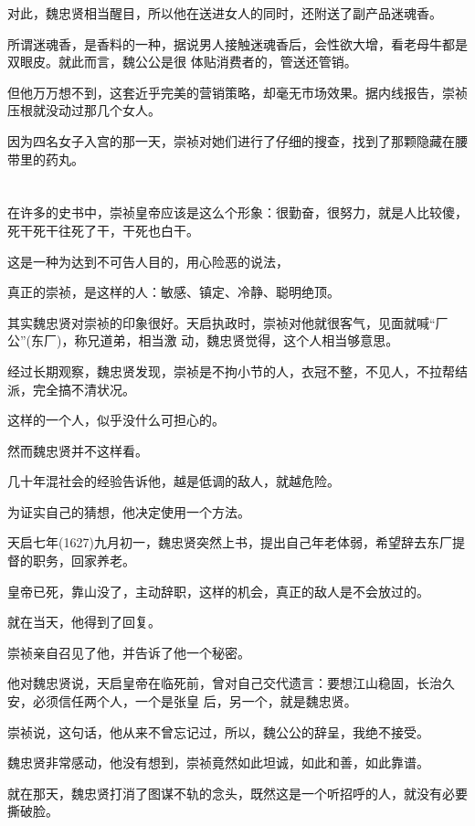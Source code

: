 \documentclass[11pt,a4paper,onecolumn]{article}
\begin{document}
对此，魏忠贤相当醒目，所以他在送进女人的同时，还附送了副产品\myrule 迷魂香。

所谓迷魂香，是香料的一种，据说男人接触迷魂香后，会性欲大增，看老母牛都是双眼皮。就此而言，魏公公是很
体贴消费者的，管送还管销。

但他万万想不到，这套近乎完美的营销策略，却毫无市场效果。据内线报告，崇祯压根就没动过那几个女人。

因为四名女子入宫的那一天，崇祯对她们进行了仔细的搜查，找到了那颗隐藏在腰带里的药丸。

\section[\thesection]{}

在许多的史书中，崇祯皇帝应该是这么个形象：很勤奋，很努力，就是人比较傻，死干死干往死了干，干死也白干。

这是一种为达到不可告人目的，用心险恶的说法，

真正的崇祯，是这样的人：敏感、镇定、冷静、聪明绝顶。

其实魏忠贤对崇祯的印象很好。天启执政时，崇祯对他就很客气，见面就喊``厂公''(东厂)，称兄道弟，相当激
动，魏忠贤觉得，这个人相当够意思。

经过长期观察，魏忠贤发现，崇祯是不拘小节的人，衣冠不整，不见人，不拉帮结派，完全搞不清状况。

这样的一个人，似乎没什么可担心的。

然而魏忠贤并不这样看。

几十年混社会的经验告诉他，越是低调的敌人，就越危险。

为证实自己的猜想，他决定使用一个方法。

天启七年(1627)九月初一，魏忠贤突然上书，提出自己年老体弱，希望辞去东厂提督的职务，回家养老。

皇帝已死，靠山没了，主动辞职，这样的机会，真正的敌人是不会放过的。

就在当天，他得到了回复。

崇祯亲自召见了他，并告诉了他一个秘密。

他对魏忠贤说，天启皇帝在临死前，曾对自己交代遗言：要想江山稳固，长治久安，必须信任两个人，一个是张皇
后，另一个，就是魏忠贤。

崇祯说，这句话，他从来不曾忘记过，所以，魏公公的辞呈，我绝不接受。

魏忠贤非常感动，他没有想到，崇祯竟然如此坦诚，如此和善，如此靠谱。

就在那天，魏忠贤打消了图谋不轨的念头，既然这是一个听招呼的人，就没有必要撕破脸。
\end{document}
